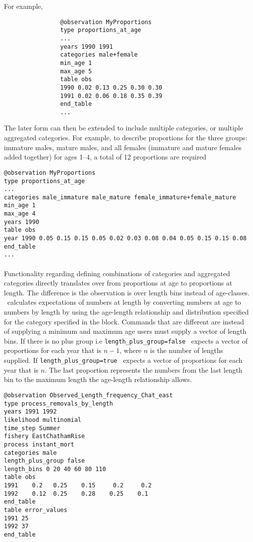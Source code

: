 {{For example,
		
{\small{\begin{verbatim}
				@observation MyProportions
				type proportions_at_age 
				...
				years 1990 1991
				categories male+female
				min_age 1
				max_age 5
				table obs
				1990 0.02 0.13 0.25 0.30 0.30
				1991 0.02 0.06 0.18 0.35 0.39
				end_table
				...
				\end{verbatim}
				
The later form can then be extended to include multiple categories, or multiple aggregated categories. For example, to describe proportions for the three groups: immature males, mature males, and all females (immature and mature females added together) for ages 1--4, a total of 12 proportions are required 
				
{\small{\begin{verbatim}
@observation MyProportions
type proportions_at_age
...
categories male_immature male_mature female_immature+female_mature
min_age 1
max_age 4
years 1990
table obs
year 1990 0.05 0.15 0.15 0.05 0.02 0.03 0.08 0.04 0.05 0.15 0.15 0.08
end_table
...
\end{verbatim}}}


\paragraph*{}
Functionality regarding defining combinations of categories and aggregated categories directly translates over from proportions at age to proportions at length. The difference is the observation is over length bins instead of age-classes. \CNAME\ calculates expectations of numbers at length by converting numbers at age to numbers by length by using the age-length relationship and distribution specified for the category specified in the  block. Commands that are different are instead of supplying a minimum and maximum age users must supply a vector of length bins. If there is no plus group i.e \texttt{length\_plus\_group=false} \CNAME\ expects a vector of proportions for each year that is $n - 1$, where $n$ is the number of lengths supplied. If \texttt{length\_plus\_group=true} \CNAME\ expects a vector of proportions for each year that is $n$. The last proportion represents the numbers from the last length bin to the maximum length the age-length relationship allows.


{\small{\begin{verbatim}
@observation Observed_Length_frequency_Chat_east
type process_removals_by_length
years 1991 1992
likelihood multinomial
time_step Summer
fishery EastChathamRise
process instant_mort
categories male
length_plus_group false
length_bins 0 20 40 60 80 110
table obs
1991    0.2   0.25    0.15     0.2     0.2 
1992    0.12  0.25    0.28    0.25    0.1 
end_table
table error_values
1991 25
1992 37
end_table  
\end{verbatim}}}
 
}}}}
